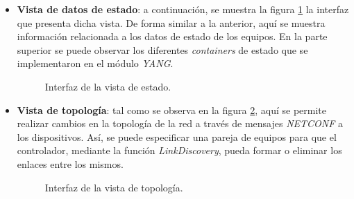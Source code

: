 \begin{itemize}
    \item \textbf{Vista de datos de estado}: a continuación, se muestra la figura \ref{fig:captura_web_estado} la interfaz que presenta dicha vista. De forma similar a la anterior, aquí se muestra información relacionada a los datos de estado de los equipos. En la parte superior se puede observar los diferentes \textit{containers} de estado que se implementaron en el módulo \textit{YANG}.  
    
    \begin{figure}[H]
        \centering
        \caption{Interfaz de la vista de estado.}
        \label{fig:captura_web_estado}
      \end{figure}

    \item \textbf{Vista de topología}: tal como se observa en la figura \ref{fig:captura_web_topo}, aquí se permite realizar cambios en la topología de la red a través de mensajes \textit{NETCONF} a los dispositivos. Así, se puede especificar una pareja de equipos para que el controlador, mediante la función \textit{LinkDiscovery}, pueda formar o eliminar los enlaces entre los mismos.
    
    \begin{figure}[H]
        \centering
        \caption{Interfaz de la vista de topología.}
        \label{fig:captura_web_topo}
      \end{figure}
    

\end{itemize}
